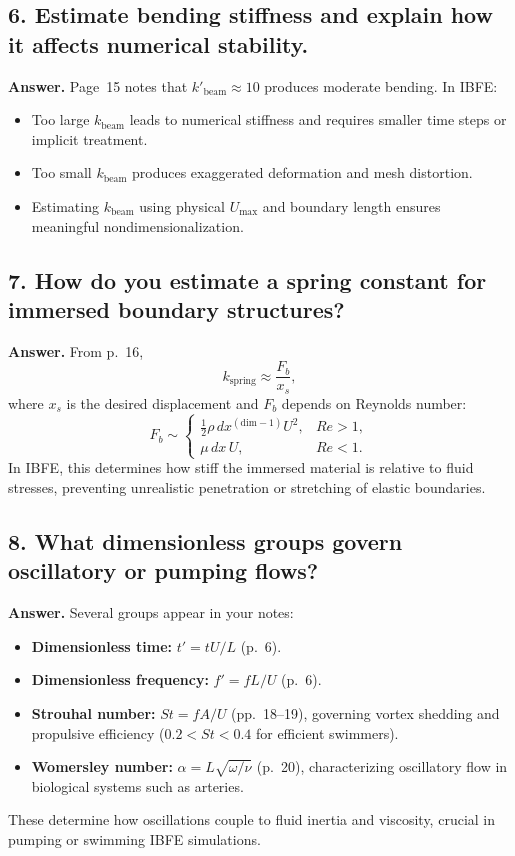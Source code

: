 \documentclass[12pt]{article}
\begin{document}
\subsection*{6. Estimate bending stiffness and explain how it affects numerical stability.}

\textbf{Answer.}
Page~15 notes that $k'_{\text{beam}}\approx 10$ produces moderate bending.
In IBFE:
\begin{itemize}
    \item Too large $k_{\text{beam}}$ leads to numerical stiffness and requires
          smaller time steps or implicit treatment.
    \item Too small $k_{\text{beam}}$ produces exaggerated deformation and mesh
          distortion.
    \item Estimating $k_{\text{beam}}$ using physical $U_{\max}$ and boundary 
          length ensures meaningful nondimensionalization.
\end{itemize}

\subsection*{7. How do you estimate a spring constant for immersed boundary structures?}

\textbf{Answer.}
From p.~16,
\[
k_{\text{spring}} \approx \frac{F_b}{x_s},
\]
where $x_s$ is the desired displacement and $F_b$ depends on Reynolds number:
\[
F_b \sim
\begin{cases}
\frac{1}{2}\rho\,dx^{(\mathrm{dim}-1)}U^2, & Re>1,\\[6pt]
\mu\,dx\,U, & Re<1.
\end{cases}
\]
In IBFE, this determines how stiff the immersed material is relative to fluid
stresses, preventing unrealistic penetration or stretching of elastic boundaries.

\subsection*{8. What dimensionless groups govern oscillatory or pumping flows?}

\textbf{Answer.}
Several groups appear in your notes:
\begin{itemize}
    \item \textbf{Dimensionless time:} $t'=tU/L$ (p.~6).
    \item \textbf{Dimensionless frequency:} $f'=fL/U$ (p.~6).
    \item \textbf{Strouhal number:} $St = fA/U$ (pp.~18--19),
          governing vortex shedding and propulsive efficiency
          ($0.2<St<0.4$ for efficient swimmers).
    \item \textbf{Womersley number:} $\alpha = L\sqrt{\omega/\nu}$ (p.~20),
          characterizing oscillatory flow in biological systems such as arteries.
\end{itemize}
These determine how oscillations couple to fluid inertia and viscosity, crucial
in pumping or swimming IBFE simulations.
\end{document}
